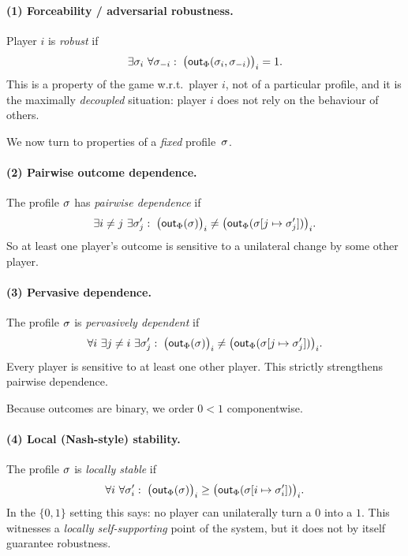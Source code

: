 \paragraph{(1) Forceability / adversarial robustness.}
Player $i$ is \emph{robust} if
\[
  \exists \profile_i\ \forall \profile_{-i}:\;
  \bigl(\mathsf{out}_\Phi(\profile_i,\profile_{-i})\bigr)_i = 1.
\]
This is a property of the game w.r.t.\ player $i$, not of a particular profile,
and it is the maximally \emph{decoupled} situation: player $i$ does not rely on
the behaviour of others.

\medskip
We now turn to properties of a \emph{fixed} profile~$\sigma$.

\paragraph{(2) Pairwise outcome dependence.}
The profile $\sigma$ has \emph{pairwise dependence} if
\[
  \exists i \ne j\ \exists \sigma_j':\;
  \bigl(\mathsf{out}_\Phi(\sigma)\bigr)_i
  \ne
  \bigl(\mathsf{out}_\Phi(\sigma[j \mapsto \sigma_j'])\bigr)_i.
\]
So at least one player’s outcome is sensitive to a unilateral change by some
other player.

\paragraph{(3) Pervasive dependence.}
The profile $\sigma$ is \emph{pervasively dependent} if
\[
  \forall i\ \exists j \ne i\ \exists \sigma_j':\;
  \bigl(\mathsf{out}_\Phi(\sigma)\bigr)_i
  \ne
  \bigl(\mathsf{out}_\Phi(\sigma[j \mapsto \sigma_j'])\bigr)_i.
\]
Every player is sensitive to at least one other player. This strictly
strengthens pairwise dependence.

\medskip
Because outcomes are binary, we order $0 < 1$ componentwise.

\paragraph{(4) Local (Nash-style) stability.}
The profile $\sigma$ is \emph{locally stable} if
\[
  \forall i\ \forall \profile_i':\;
  \bigl(\mathsf{out}_\Phi(\profile)\bigr)_i
  \ge
  \bigl(\mathsf{out}_\Phi(\profile[i \mapsto \profile_i'])\bigr)_i.
\]
In the $\{0,1\}$ setting this says: no player can unilaterally turn a $0$ into a
$1$. This witnesses a \emph{locally self-supporting} point of the system, but it
does not by itself guarantee robustness.

